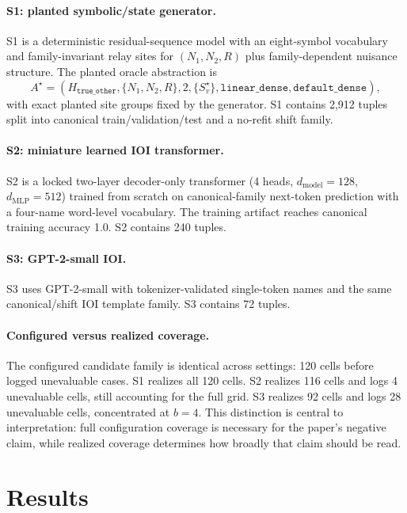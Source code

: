\documentclass[10pt]{article}
\newcommand{\Astar}{A^{\star}}
\begin{document}
\paragraph{S1: planted symbolic/state generator.}
S1 is a deterministic residual-sequence model with an eight-symbol vocabulary and family-invariant relay sites for $(N_1,N_2,R)$ plus family-dependent nuisance structure. The planted oracle abstraction is
\[
\Astar=(H_{\texttt{true\_other}},\{N_1,N_2,R\},2,\{S^{\star}_v\},\texttt{linear\_dense},\texttt{default\_dense}),
\]
with exact planted site groups fixed by the generator. S1 contains 2,912 tuples split into canonical train/validation/test and a no-refit shift family.

\paragraph{S2: miniature learned IOI transformer.}
S2 is a locked two-layer decoder-only transformer (4 heads, $d_{\text{model}}=128$, $d_{\text{MLP}}=512$) trained from scratch on canonical-family next-token prediction with a four-name word-level vocabulary. The training artifact reaches canonical training accuracy 1.0. S2 contains 240 tuples.

\paragraph{S3: GPT-2-small IOI.}
S3 uses GPT-2-small \citep{radford2019language} with tokenizer-validated single-token names and the same canonical/shift IOI template family. S3 contains 72 tuples.

\paragraph{Configured versus realized coverage.}
The configured candidate family is identical across settings: 120 cells before logged unevaluable cases. S1 realizes all 120 cells. S2 realizes 116 cells and logs 4 unevaluable cells, still accounting for the full grid. S3 realizes 92 cells and logs 28 unevaluable cells, concentrated at $b=4$. This distinction is central to interpretation: full configuration coverage is necessary for the paper's negative claim, while realized coverage determines how broadly that claim should be read.

\section{Results}
\end{document}

